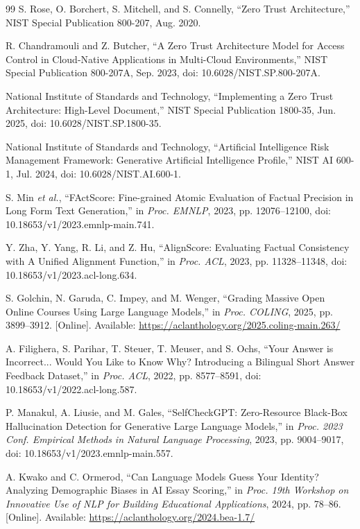 \documentclass[conference]{IEEEtran}
\begin{document}
\begin{thebibliography}{99}
S. Rose, O. Borchert, S. Mitchell, and S. Connelly,
``Zero Trust Architecture,''
NIST Special Publication 800-207, Aug. 2020.

R. Chandramouli and Z. Butcher,
``A Zero Trust Architecture Model for Access Control in Cloud-Native Applications in Multi-Cloud Environments,''
NIST Special Publication 800-207A, Sep. 2023, doi: 10.6028/NIST.SP.800-207A.

National Institute of Standards and Technology,
``Implementing a Zero Trust Architecture: High-Level Document,'' NIST Special Publication 1800-35, Jun. 2025, doi: 10.6028/NIST.SP.1800-35.

National Institute of Standards and Technology,
``Artificial Intelligence Risk Management Framework: Generative Artificial Intelligence Profile,''
NIST AI 600-1, Jul. 2024, doi: 10.6028/NIST.AI.600-1.

S. Min \emph{et al.}, ``FActScore: Fine-grained Atomic Evaluation of Factual Precision in Long Form Text Generation,'' in \emph{Proc. EMNLP}, 2023, pp. 12076--12100, doi: 10.18653/v1/2023.emnlp-main.741.

Y. Zha, Y. Yang, R. Li, and Z. Hu, ``AlignScore: Evaluating Factual Consistency with A Unified Alignment Function,'' in \emph{Proc. ACL}, 2023, pp. 11328--11348, doi: 10.18653/v1/2023.acl-long.634.

S. Golchin, N. Garuda, C. Impey, and M. Wenger, ``Grading Massive Open Online Courses Using Large Language Models,'' in \emph{Proc. COLING}, 2025, pp. 3899--3912. [Online]. Available: \url{https://aclanthology.org/2025.coling-main.263/}

A. Filighera, S. Parihar, T. Steuer, T. Meuser, and S. Ochs,
``Your Answer is Incorrect... Would You Like to Know Why? Introducing a Bilingual Short Answer Feedback Dataset,'' in \emph{Proc. ACL}, 2022, pp. 8577--8591, doi: 10.18653/v1/2022.acl-long.587.

P. Manakul, A. Liusie, and M. Gales,
``SelfCheckGPT: Zero-Resource Black-Box Hallucination Detection for Generative Large Language Models,''
in \emph{Proc. 2023 Conf. Empirical Methods in Natural Language Processing}, 2023, pp. 9004--9017, doi: 10.18653/v1/2023.emnlp-main.557.

A. Kwako and C. Ormerod, ``Can Language Models Guess Your Identity? Analyzing Demographic Biases in AI Essay Scoring,'' in \emph{Proc. 19th Workshop on Innovative Use of NLP for Building Educational Applications}, 2024, pp. 78--86. [Online]. Available: \url{https://aclanthology.org/2024.bea-1.7/}


\end{thebibliography}
\end{document}
